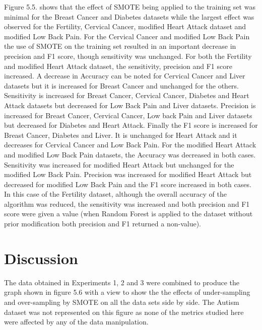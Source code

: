 Figure 5.5. shows that the effect of SMOTE being applied to the training set was minimal for the Breast Cancer and Diabetes datasets while the largest effect was observed for the Fertility, Cervical Cancer,  modified Heart Attack dataset and modified Low Back Pain.\newline 
For the Cervical Cancer and modified Low Back Pain the use of SMOTE on the training set resulted in an important decrease in precision and F1 score, though sensitivity was unchanged.\newline
For both the Fertility and modified Heart Attack dataset, the sensitivity, precision and F1 score increased.\newline
A decrease in Accuracy can be noted for Cervical Cancer and Liver datasets but it is increased for Breast Cancer and unchanged for the others.\newline
Sensitivity is increased for Breast Cancer, Cervical Cancer, Diabetes and Heart Attack datasets but decreased for Low Back Pain and Liver datasets. Precision is increased for Breast Cancer, Cervical Cancer, Low back Pain and Liver datasets but decreased for Diabetes and Heart Attack. Finally the F1 score is increased for Breast Cancer, Diabetes and Liver. It is unchanged for Heart Attack and it decreases for Cervical Cancer and Low Back Pain.\newline
For the modified Heart Attack and modified Low Back Pain datasets, the Accuracy was decreased in both cases. Sensitivity was increased for modified Heart Attack but unchanged for the modified Low Back Pain. Precision was increased for modified Heart Attack but decreased for modified Low Back Pain and the F1 score increased in both cases.\newline
In this case of the Fertility dataset, although the overall accuracy of the algorithm was reduced, the sensitivity was increased and both precision and F1 score were given a value (when Random Forest is applied to the dataset without prior modification both precision and F1 returned a non-value).\newline


\section{Discussion}
The data obtained in Experiments 1, 2 and 3 were combined to produce the graph shown in figure 5.6 with a view to show the the effects of under-sampling and over-sampling by SMOTE on all the data sets side by side. The Autism dataset was not represented on this figure as none of the metrics studied here were affected by any of the data manipulation.\newline

